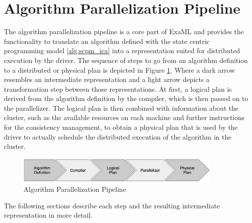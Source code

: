 \section{Algorithm Parallelization Pipeline}
\label{s:algo_parallel_pipeline}
The algorithm parallelization pipeline is a core part of ExaML and provides the functionality to translate an algorithm defined with the state centric programming model \eqref{alg:scpm_ica} into a representation suited for distributed execution by the driver.
The sequence of steps to go from an algorithm definition to a distributed or physical plan is depicted in Figure \ref{fig:parallel_pipeline}.
Where a dark arrow resembles an intermediate representation and a light arrow depicts a transformation step between those representations.
At first, a logical plan is derived from the algorithm definition by the compiler, which is then passed on to the parallelizer.
The logical plan is then combined with information about the cluster, such as the available resources on each machine and further instructions for the consistency management, to obtain a physical plan that is used by the driver to actually schedule the distributed execution of the algorithm in the cluster.
\begin{figure}[ht]
\centering
\includegraphics[width=0.9\textwidth]{img/algo_parallel_pipeline.png}
\caption{Algorithm Parallelization Pipeline}
\label{fig:parallel_pipeline}
\end{figure}
The following sections describe each step and the resulting intermediate representation in more detail.


